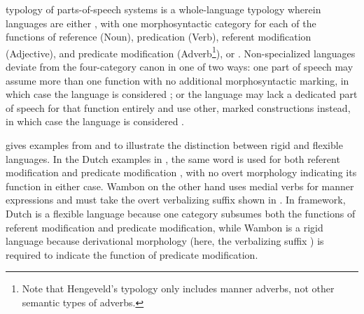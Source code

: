  typology of parts-of-speech systems is a whole-language typology wherein languages are either , with one morphosyntactic category for each of the functions of reference (Noun), predication (Verb), referent modification (Adjective), and predicate modification (Adverb\footnote{Note that Hengeveld's typology only includes manner adverbs, not other semantic types of adverbs.}), or . Non-specialized languages deviate from the four-category canon in one of two ways: one part of speech may assume more than one function with no additional morphosyntactic marking, in which case the language is considered ; or the language may lack a dedicated part of speech for that function entirely and use other, marked constructions instead, in which case the language is considered .

\citeauthor{Hengeveld1992} gives examples from  and  to illustrate the distinction between rigid and flexible languages. In the Dutch examples in , the same word  is used for both referent modification  and predicate modification , with no overt morphology indicating its function in either case. Wambon on the other hand uses medial verbs for manner expressions and must take the overt verbalizing suffix  shown in . In  framework, Dutch is a flexible language because one category subsumes both the functions of referent modification and predicate modification, while Wambon is a rigid language because derivational morphology (here, the verbalizing suffix ) is required to indicate the function of predicate modification.


